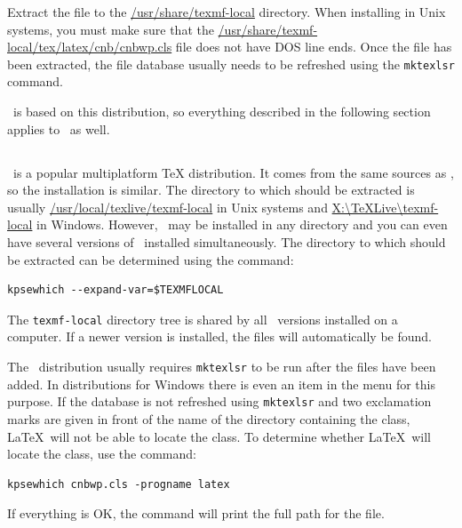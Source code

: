 \documentclass[12pt]{article}
\begin{document}
Extract the  file to the \url{/usr/share/texmf-local} directory. When
installing in
Unix systems, you must make sure that the
\url{/usr/share/texmf-local/tex/latex/cnb/cnbwp.cls} file
does not have DOS line ends. Once the file has been extracted, the file database usually
needs to
be refreshed using the \texttt{mktexlsr} command.

\TeXLive\ is based on this distribution, so everything described in the following
section applies to \teTeX\ as well.

\subsection{\TeXLive}\label{inst.tl} \TeXLive\ is a popular multiplatform \TeX{} distribution. It
comes from the same sources as \hyperref[inst.tetex]{\teTeX}, so the installation is similar. The
directory to which  should be extracted is usually
\url{/usr/local/texlive/texmf-local} in Unix
systems and \url{X:\TeXLive\texmf-local} in Windows. However, \TeXLive\ may be installed
in any
directory and you can even have several versions of \TeXLive\ installed simultaneously.
The
directory to which  should be extracted can be determined using the command:

\begin{verbatim}
kpsewhich --expand-var=$TEXMFLOCAL
\end{verbatim}

The \texttt{texmf-local} directory tree is shared by all \TeXLive\ versions installed on
a computer. If a newer version is installed, the files will automatically be found.

\pozor The \TeXLive\ distribution usually requires \texttt{mktexlsr} to be run after the files have
been added. In distributions for Windows there is even an item in the \TeXLive menu for this
purpose. If the database is not refreshed using \texttt{mktexlsr} and two exclamation marks are
given in front of the name of the directory containing the  class, \LaTeX\ will not be
able to locate the class. To determine whether \LaTeX\ will locate the class, use the command:

\begin{verbatim}
kpsewhich cnbwp.cls -progname latex
\end{verbatim}	

\noindent If everything is OK, the command will print the full path for the  file.
\end{document}
